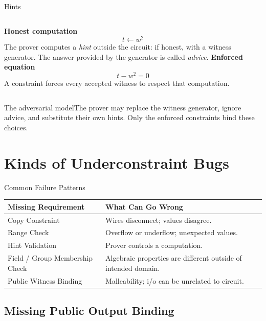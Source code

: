 \documentclass[aspectratio=169,11pt]{beamer}
\begin{document}
\begin{frame}{Hints}
\begin{columns}[T]
\textbf{Honest computation}
\[t \leftarrow w^2\]
The prover computes a \emph{hint} outside the circuit: if honest, with a witness generator.  The answer provided by the generator is called \emph{advice}.
\textbf{Enforced equation}
\[t-w^2=0\]
A constraint forces every accepted witness to respect that computation.
\end{columns}
\vspace{6mm}\begin{block}{The adversarial model}The prover may replace the witness generator, ignore advice, and substitute their own hints. Only the enforced constraints bind these choices.\end{block}
\end{frame}

\section{Kinds of Underconstraint Bugs}

\begin{frame}{Common Failure Patterns}
\begin{tabular}{>{\raggedright\arraybackslash}p{}>{\raggedright\arraybackslash}p{}}\toprule
Missing Requirement & What Can Go Wrong\\\midrule
Copy Constraint & Wires disconnect; values disagree.\\[2mm]
Range Check & Overflow or underflow; unexpected values.\\[2mm]
Hint Validation & Prover controls a computation.\\[2mm]
Field / Group Membership Check & Algebraic properties are different outside of intended domain.\\[2mm]
Public Witness Binding & Malleability; i/o can be unrelated to circuit.\\\bottomrule\end{tabular}
\end{frame}

\subsection{Missing Public Output Binding}
\end{document}
